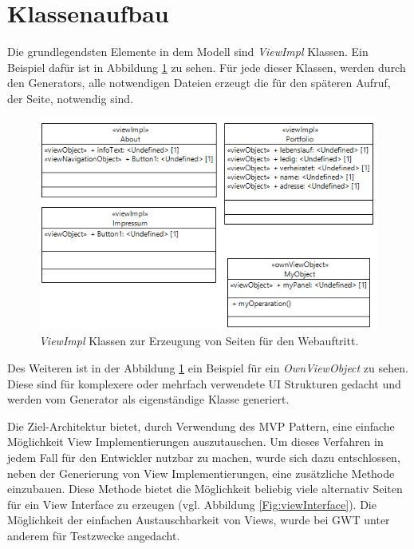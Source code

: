 \newpage
\section{Klassenaufbau}
Die grundlegendsten Elemente in dem Modell sind \textit{ViewImpl} Klassen. Ein
Beispiel dafür ist in Abbildung \ref{Fig:viewimpl} zu sehen. Für jede dieser
Klassen, werden durch den Generators, alle notwendigen Dateien
erzeugt die für den späteren Aufruf, der Seite, notwendig sind.

\begin{figure}[htbp]
\begin{center}
\includegraphics[width=1.0\textwidth]{./img/GWT-Model-Views-alg.png}
\caption{\textit{ViewImpl} Klassen zur Erzeugung von Seiten
für den Webauftritt.}\label{Fig:viewimpl}
\end{center}
\end{figure}

Des Weiteren ist in der Abbildung \ref{Fig:viewimpl} ein Beispiel für ein
\textit{OwnViewObject} zu sehen. Diese sind für komplexere oder mehrfach
verwendete UI Strukturen gedacht und werden vom Generator als eigenständige
Klasse generiert.

Die Ziel-Architektur bietet, durch Verwendung des MVP Pattern, eine einfache
Möglichkeit View Implementierungen auszutauschen. Um dieses Verfahren in
jedem Fall für den Entwickler nutzbar zu machen, wurde sich dazu entschlossen,
neben der Generierung von View Implementierungen, eine zusätzliche Methode
einzubauen. Diese Methode bietet die Möglichkeit beliebig viele alternativ
Seiten für ein View Interface zu erzeugen (vgl. Abbildung
\ref{Fig:viewInterface}). Die Möglichkeit der einfachen Austauschbarkeit von
Views, wurde bei GWT unter anderem für Testzwecke angedacht.

